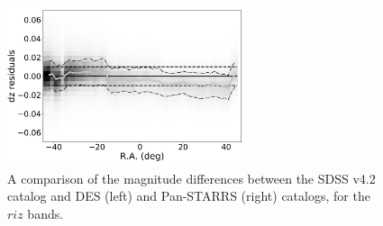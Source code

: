 \documentclass[fleqn,usenatbib]{mnras}
\begin{document}
\begin{figure}[th!]
    \centering\includegraphics[width=7cm]{figures/colorResidPSDR2v42bright_dz_RA_Hess.png}
\caption{A comparison of the magnitude differences between the SDSS v4.2 catalog
and DES (left) and Pan-STARRS (right) catalogs, for the $riz$ bands.}
\label{fig:DESPSRA}
\end{figure}
\end{document}
